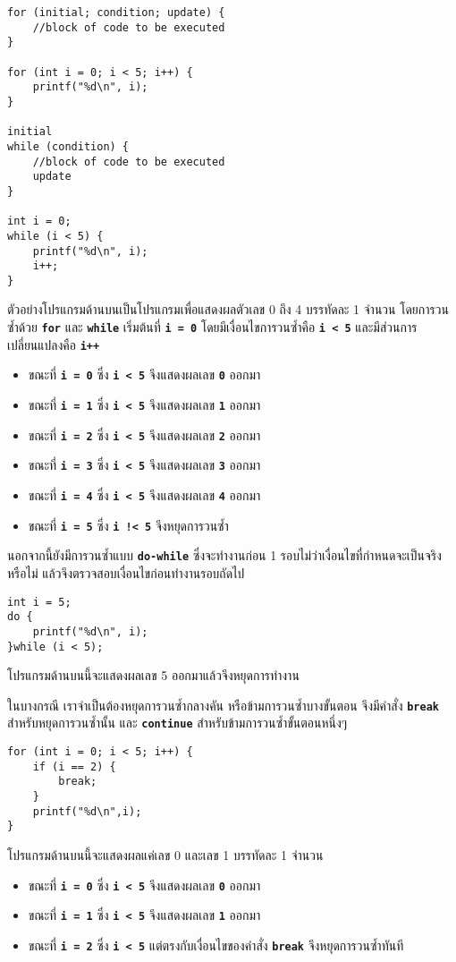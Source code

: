 \begin{lstlisting}
for (initial; condition; update) {
	//block of code to be executed
}

for (int i = 0; i < 5; i++) {
	printf("%d\n", i);
}

initial
while (condition) {
	//block of code to be executed
    update
}

int i = 0;
while (i < 5) {
	printf("%d\n", i);
    i++;
}
\end{lstlisting}
ตัวอย่างโปรแกรมด้านบนเป็นโปรแกรมเพื่อแสดงผลตัวเลข 0 ถึง 4 บรรทัดละ 1 จำนวน โดยการวนซ้ำด้วย \textbf{\texttt{for}} และ \textbf{\texttt{while}} เริ่มต้นที่ \textbf{\texttt{i = 0}} โดยมีเงื่อนไขการวนซ้ำคือ \textbf{\texttt{i < 5}} และมีส่วนการเปลี่ยนแปลงคือ \textbf{\texttt{i++}}
\begin{itemize}
\item ขณะที่ \textbf{\texttt{i = 0}} ซึ่ง \textbf{\texttt{i < 5}} จึงแสดงผลเลข \textbf{\texttt{0}} ออกมา
\item ขณะที่ \textbf{\texttt{i = 1}} ซึ่ง \textbf{\texttt{i < 5}} จึงแสดงผลเลข \textbf{\texttt{1}} ออกมา
\item ขณะที่ \textbf{\texttt{i = 2}} ซึ่ง \textbf{\texttt{i < 5}} จึงแสดงผลเลข \textbf{\texttt{2}} ออกมา
\item ขณะที่ \textbf{\texttt{i = 3}} ซึ่ง \textbf{\texttt{i < 5}} จึงแสดงผลเลข \textbf{\texttt{3}} ออกมา
\item ขณะที่ \textbf{\texttt{i = 4}} ซึ่ง \textbf{\texttt{i < 5}} จึงแสดงผลเลข \textbf{\texttt{4}} ออกมา
\item ขณะที่ \textbf{\texttt{i = 5}} ซึ่ง \textbf{\texttt{i !< 5}} จึงหยุดการวนซ้ำ
\end{itemize}
นอกจากนี้ยังมีการวนซ้ำแบบ \textbf{\texttt{do-while}} ซึ่งจะทำงานก่อน 1 รอบไม่ว่าเงื่อนไขที่กำหนดจะเป็นจริงหรือไม่ แล้วจึงตรวจสอบเงื่อนไขก่อนทำงานรอบถัดไป
\begin{lstlisting}
int i = 5;
do {
	printf("%d\n", i);
}while (i < 5);
\end{lstlisting}
โปรแกรมด้านบนนี้จะแสดงผลเลข 5 ออกมาแล้วจึงหยุดการทำงาน

ในบางกรณี เราจำเป็นต้องหยุดการวนซ้ำกลางคัน หรือข้ามการวนซ้ำบางขั้นตอน จึงมีคำสั่ง \textbf{\texttt{break}} สำหรับหยุดการวนซ้ำนั้น และ \textbf{\texttt{continue}} สำหรับข้ามการวนซ้ำขั้นตอนหนึ่งๆ
\begin{lstlisting}
for (int i = 0; i < 5; i++) {
	if (i == 2) {
    	break;
    }
	printf("%d\n",i);
}
\end{lstlisting}
โปรแกรมด้านบนนี้จะแสดงผลแค่เลข 0 และเลข 1 บรรทัดละ 1 จำนวน
\begin{itemize}
\item ขณะที่ \textbf{\texttt{i = 0}} ซึ่ง \textbf{\texttt{i < 5}} จึงแสดงผลเลข \textbf{\texttt{0}} ออกมา
\item ขณะที่ \textbf{\texttt{i = 1}} ซึ่ง \textbf{\texttt{i < 5}} จึงแสดงผลเลข \textbf{\texttt{1}} ออกมา
\item ขณะที่ \textbf{\texttt{i = 2}} ซึ่ง \textbf{\texttt{i < 5}} แต่ตรงกับเงื่อนไขของคำสั่ง \textbf{\texttt{break}} จึงหยุดการวนซ้ำทันที
\end{itemize}

